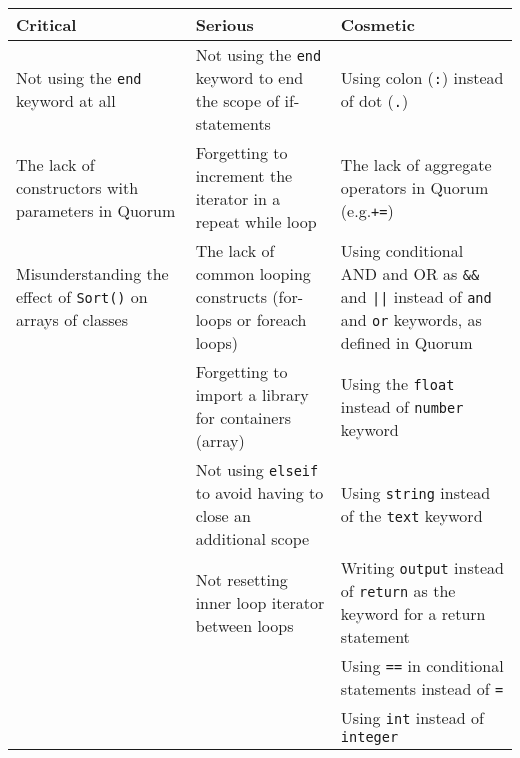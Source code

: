 \begin{table}[!h]
\centering
\renewcommand{\arraystretch}{1.5}
\label{QuorumProblemResult}
\begin{tabular}{| p{5cm} | p{5cm} | p{5cm} |}
\hline
\textbf{Critical}                                          & \textbf{Serious}                                                   & \textbf{Cosmetic}                                                                                        \\ \hline
Not using the \lstinline!end! keyword at all               & Not using the \lstinline!end! keyword to end the scope of if-statements      & Using colon (\lstinline!:!) instead of dot (\lstinline!.!)                               \\ \hline
The lack of constructors with parameters in Quorum         & Forgetting to increment the iterator in a repeat while loop        & The lack of aggregate operators in Quorum (e.g.\lstinline!+=!)                                           \\ \hline
Misunderstanding the effect of \lstinline!Sort()! on arrays of classes & The lack of common looping constructs (for-loops or foreach loops) & Using conditional AND and OR as \lstinline!&&! and \lstinline!||! instead of \lstinline!and! and \lstinline!or! keywords, as defined in Quorum \\ \hline
                                                           & Forgetting to import a library for containers (array)              & Using the \lstinline!float! instead of \lstinline!number! keyword                                                            \\ \hline
                                                           & Not using \lstinline!elseif! to avoid having to close an additional scope    & Using \lstinline!string! instead of the \lstinline!text! keyword                                \\ \hline
                                                           & Not resetting inner loop iterator between loops                    & Writing \lstinline!output! instead of \lstinline!return! as the keyword for a return statement           \\ \hline
                                                           &                                                                    & Using \lstinline!==! in conditional statements instead of \lstinline!=!                                  \\ \hline
                                                           &                                                                    & Using \lstinline!int! instead of \lstinline!integer!                                                     \\ \hline

\end{tabular}
\end{table}
